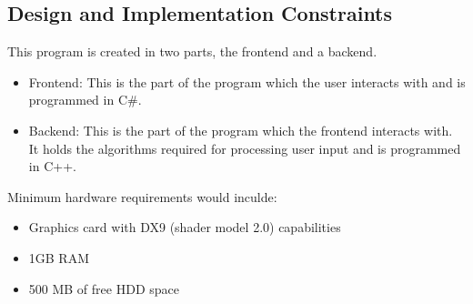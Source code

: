 \subsection{Design and Implementation Constraints}
This program is created in two parts, the frontend and a backend.
\begin{itemize}
    \item Frontend: This is the part of the program which the user interacts with
                    and is programmed in C\#.
    \item Backend: This is the part of the program which the frontend interacts
                    with. It holds the algorithms required for processing user input
                    and is programmed in C++.
\end{itemize}
Minimum hardware requirements would inculde:
\begin{itemize}
    \item Graphics card with DX9 (shader model 2.0) capabilities
    \item 1GB RAM
    \item 500 MB of free HDD space
\end{itemize}
